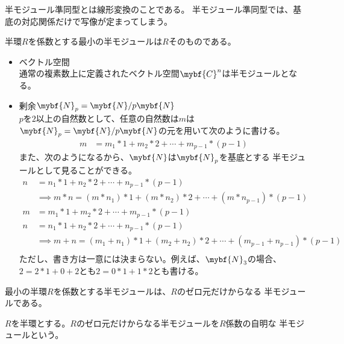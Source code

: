 	半モジュール準同型とは線形変換のことである。
	半モジュール準同型では、基底の対応関係だけで写像が定まってしまう。

	半環$R$を係数とする最小の半モジュールは$R$そのものである。

	\begin{example}[半モジュールの例]\label{eg:半モジュールの例} %
		\begin{itemize}
			\item ベクトル空間 \\
			通常の複素数上に定義されたベクトル空間$\mybf{C}^n$は半モジュールとなる。
			\item 剰余$\mybf{N}_p=\mybf{N}/p\mybf{N}$ \\
			$p$を$2$以上の自然数として、任意の自然数は$m$は
			$\mybf{N}_p=\mybf{N}/p\mybf{N}$の元を用いて次のように書ける。
			\begin{equation*}\begin{split} %
				m &= m_1*1 + m_2*2 + \cdots + m_{p-1}*(p-1)
			\end{split}\end{equation*} %
			また、次のようになるから、$\mybf{N}$は$\mybf{N}_p$を基底とする
			半モジュールとして見ることができる。
			\begin{equation*}\begin{split} %
				n &= n_1*1 + n_2*2 + \cdots + n_{p-1}*(p-1) \\
				& \implies m*n = (m*n_1)*1 + (m*n_2)*2 + \cdots + (m*n_{p-1})*(p-1) \\
				m &= m_1*1 + m_2*2 + \cdots + m_{p-1}*(p-1) \\
				n &= n_1*1 + n_2*2 + \cdots + n_{p-1}*(p-1) \\
				& \implies m+n = (m_1+n_1)*1 + (m_2+n_2)*2 + \cdots + (m_{p-1}+n_{p-1})*(p-1) \\
			\end{split}\end{equation*} %
			ただし、書き方は一意には決まらない。例えば、$\mybf{N}_3$の場合、
			$2=2*1+0+2$とも$2=0*1+1*2$とも書ける。
		\end{itemize}
	\end{example} %

	最小の半環$R$を係数とする半モジュールは、$R$のゼロ元だけからなる
	半モジュールである。

	\begin{definition}[自明な半モジュール]\label{def:自明な半モジュール} %
		$R$を半環とする。$R$のゼロ元だけからなる半モジュールを$R$係数の自明な
		半モジュールという。
	\end{definition} %


